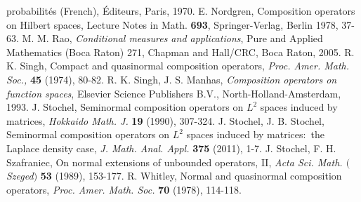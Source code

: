 \documentclass[draft,reqno]{amsproc}
\numberwithin{equation}{section}
\theoremstyle{remark}
\theoremstyle{definition}
\begin{document}
\begin{thebibliography}{99}
{probabilit\'es} (French), \'Editeurs, Paris, 1970.
    E. Nordgren, Composition operators on Hilbert
spaces, Lecture Notes in Math. {\bf 693},
Springer-Verlag, Berlin 1978, 37-63.
    M. M. Rao, {\em Conditional measures
and applications}, Pure and Applied Mathematics (Boca
Raton) 271, Chapman and Hall/CRC, Boca Raton, 2005.
    R. K. Singh,  Compact and quasinormal
composition operators, {\em Proc. Amer. Math. Soc.,}
{\bf 45} (1974), 80-82.
    R. K. Singh, J. S. Manhas,
{\em Composition operators on function spaces},
Elsevier Science Publishers B.V.,
North-Holland-Amsterdam, 1993.
    J. Stochel, Seminormal composition
operators on $L^2$ spaces induced by matrices, {\em
Hokkaido Math. J.} {\bf 19} (1990), 307-324.
    J. Stochel, J. B. Stochel, Seminormal
composition operators on $L^2$ spaces induced by
matrices:\ the Laplace density case, {\em J. Math.
Anal. Appl.} {\bf 375} (2011), 1-7.
     J. Stochel, F. H. Szafraniec, On normal
extensions of unbounded operators, II, {\em Acta Sci.
Math. $($Szeged$)$} {\bf 53} (1989), 153-177.
    R. Whitley, Normal and quasinormal composition
operators, {\em Proc. Amer. Math. Soc.} {\bf 70}
(1978), 114-118.
   \end{thebibliography}
   
\end{document}
